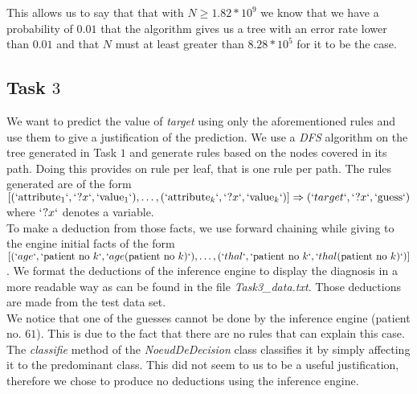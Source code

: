 \documentclass[8pt]{extarticle}
\begin{document}
	
	

	

This allows us to say that that with $N\geq1.82*10^9$ we know that we have a probability of $0.01$ that the algorithm gives us a tree with an error rate lower than $0.01$ and that $N$ must at least greater than $8.28*10^5$ for it to be the case.

\subsection{Task $3$}
	We want to predict the value of \emph{target} using only the aforementioned rules and use them to give a justification of the prediction.
	We use a \emph{DFS} algorithm on the tree generated in Task $1$ and generate rules based on the nodes covered in its path. Doing this provides on rule per leaf, that is one rule per path. The rules generated are of the form $ [(`\mathrm{attribute}_1`,` ?x`, `\mathrm{value}_1`),\ldots,(`\mathrm{attribute}_k`,` ?x`, `\mathrm{value}_k`)]\Rightarrow(`target`, `?x` , `\mathrm{guess}`)$ where $`?x`$ denotes a variable.\\
	To make a deduction from those facts, we use forward chaining while giving to the engine initial facts of the form $[(`age`, `\mathrm{patient\ no}\ k`, `age(\mathrm{patient\ no}\ k)`),\ldots,(`thal`, `\mathrm{patient\ no}\ k`, `thal(\mathrm{patient\ no}\ k)`)]$. We format the deductions of the inference engine to display the diagnosis in a more readable way as can be found in the file \emph{Task3\_data.txt}. Those deductions are made from the test data set.\\
	We notice that one of the guesses cannot be done by the inference engine (patient no. $61$). This is due to the fact that there are no rules that can explain this case. The \emph{classifie} method of the \emph{NoeudDeDecision} class classifies it by simply affecting it to the predominant class. This did not seem to us to be a useful justification, therefore we chose to produce no deductions using the inference engine.
	
\end{document}
